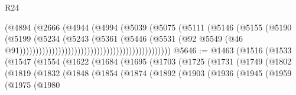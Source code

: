 \begin{lexlean}{R24}
\begin{coremodule}
{{{{{{{{{{{{{{{{{{{{{{{{{{{{{{{{{{{{{{{{{{{{{{{{{{{{{{{{{{{{{{{{{{{{{{{{{{{{{{{{{{{{{{{{{{{{{{{{{{{{{{{{{{{{{{{{{{{{{{{{{{{{{{{{{{{{{{{{{{{{{{{{{{{{{{{{{{{{{{{{{{{{{{{{{{{{{{{{{{{{{{{{{{{{{{{{{{{                                                              (@4894
                                                                (@2666
                                                                  (@4944
                                                                    (@4994
                                                                      (@5039
                                                                        (@5075
                                                                          (@5111
                                                                            (@5146
                                                                              (@5155
                                                                                (@5190
                                                                                  (@5199
                                                                                    (@5234
                                                                                      (@5243
                                                                                        (@5361
                                                                                          (@5446
                                                                                            (@5531
                                                                                              (@92
                                                                                                @5549
                                                                                                (@46
                                                                                                  @91)))))))))))))))))))))))))))))))))))))))))))))))
@5646 := @1463
    (@1516
      (@1533
        (@1547
          (@1554
            (@1622
              (@1684
                (@1695
                  (@1703
                    (@1725
                      (@1731
                        (@1749
                          (@1802
                            (@1819
                              (@1832
                                (@1848
                                  (@1854
                                    (@1874
                                      (@1892
                                        (@1903
                                          (@1936
                                            (@1945
                                              (@1959
                                                (@1975
                                                  (@1980
}}}}}}}}}}}}}}}}}}}}}}}}}}}}}}}}}}}}}}}}}}}}}}}}}}}}}}}}}}}}}}}}}}}}}}}}}}}}}}}}}}}}}}}}}}}}}}}}}}}}}}}}}}}}}}}}}}}}}}}}}}}}}}}}}}}}}}}}}}}}}}}}}}}}}}}}}}}}}}}}}}}}}}}}}}}}}}}}}}}}}}}}}}}}}}}}}}}
\end{coremodule}
\end{lexlean}

